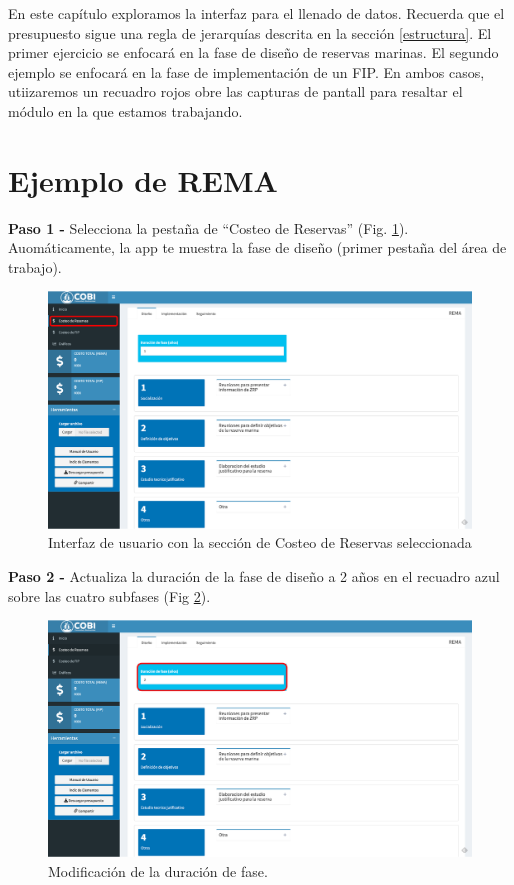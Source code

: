 \documentclass[
]{book}
\begin{document}
En este capítulo exploramos la interfaz para el llenado de datos. Recuerda que el presupuesto sigue una regla de jerarquías descrita en la sección \ref{estructura}. El primer ejercicio se enfocará en la fase de diseño de reservas marinas. El segundo ejemplo se enfocará en la fase de implementación de un FIP. En ambos casos, utiizaremos un recuadro rojos obre las capturas de pantall para resaltar el módulo en la que estamos trabajando.

\hypertarget{rema}{%
\section{Ejemplo de REMA}\label{rema}}

\textbf{Paso 1 - } Selecciona la pestaña de ``Costeo de Reservas'' (Fig. \ref{fig:rem-dis-1}). Auomáticamente, la app te muestra la fase de diseño (primer pestaña del área de trabajo).

\begin{figure}
\centering
\includegraphics{images/rema_dis_1.png}
\caption{\label{fig:rem-dis-1}Interfaz de usuario con la sección de Costeo de Reservas seleccionada}
\end{figure}

\textbf{Paso 2 - } Actualiza la duración de la fase de diseño a 2 años en el recuadro azul sobre las cuatro subfases (Fig \ref{fig:rem-dis-2}).

\begin{figure}
\centering
\includegraphics{images/rema_dis_2.png}
\caption{\label{fig:rem-dis-2}Modificación de la duración de fase.}
\end{figure}
\end{document}
